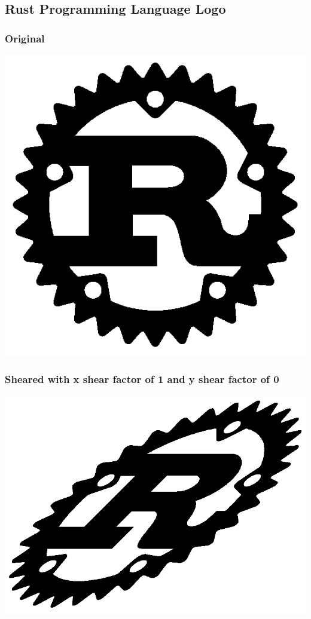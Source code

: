 \documentclass[11pt]{article}
\begin{document}
\subsection{Rust Programming Language Logo}
\label{sec:orgad60346}

\subsubsection{Original}
\label{sec:org464a323}
\begin{center}
\includegraphics[width=.9\linewidth]{./images/rust_logo.png}
\end{center}

\subsubsection{Sheared with x shear factor of 1 and y shear factor of 0}
\label{sec:org92d1af4}
\begin{center}
\includegraphics[width=.9\linewidth]{./images/rust_logo_sheared_with_x_shear_as_one_and_y_shear_as_zero.png}
\end{center}
\end{document}
